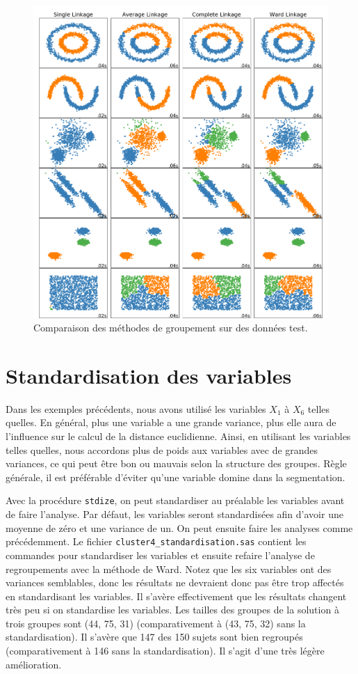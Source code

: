 \documentclass[
  11pt,
  letterpaper,
]{book}
\theoremstyle{definition}
\theoremstyle{definition}
\theoremstyle{definition}
\theoremstyle{remark}
\begin{document}
\begin{figure}

{\centering \includegraphics[width=0.8\linewidth]{figures/04-clustering-e20} 

}

\caption{Comparaison des méthodes de groupement sur des données test.}\label{fig:fig4-e20}
\end{figure}

\hypertarget{standardisation-des-variables}{%
\section{Standardisation des variables}\label{standardisation-des-variables}}

Dans les exemples précédents, nous avons utilisé les variables \(X_1\) à \(X_6\) telles quelles. En général, plus une variable a une grande variance, plus elle aura de l'influence sur le calcul de la distance euclidienne. Ainsi, en utilisant les variables telles quelles, nous accordons plus de poids aux variables avec de grandes variances, ce qui peut être bon ou mauvais selon la structure des groupes. Règle générale, il est préférable d'éviter qu'une variable domine dans la segmentation.

Avec la procédure \texttt{stdize}, on peut standardiser au préalable les variables avant de faire l'analyse. Par défaut, les variables seront standardisées afin d'avoir une moyenne de zéro et une variance de un. On peut ensuite faire les analyses comme précédemment. Le fichier \texttt{cluster4\_standardisation.sas} contient les commandes pour standardiser les variables et ensuite refaire l'analyse de regroupements avec la méthode de Ward. Notez que les six variables ont des variances semblables, donc les résultats ne devraient donc pas être trop affectés en standardisant les variables. Il s'avère effectivement que les résultats changent très peu si on standardise les variables. Les tailles des groupes de la solution à trois groupes sont (44, 75, 31) (comparativement à (43, 75, 32) sans la standardisation). Il s'avère que 147 des 150 sujets sont bien regroupés (comparativement à 146 sans la standardisation). Il s'agit d'une très légère amélioration.
\end{document}
